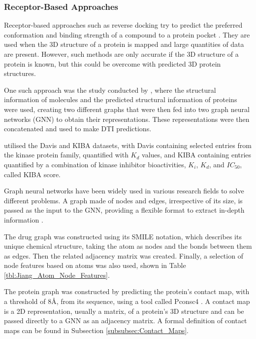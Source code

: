 \bigskip

\subsubsection{Receptor-Based Approaches}
\label{subsubsec:Receptor_Based_Approaches}

Receptor-based approaches such as reverse docking try to predict the preferred conformation and binding strength of a compound to a protein pocket \citep{Meng2011}. They are used when the 3D structure of a protein is mapped and large quantities of data are present. However, such methods are only accurate if the 3D structure of a protein is known, but this could be overcome with predicted 3D protein structures.

One such approach was the study conducted by \citet{Jiang2020}, where the structural information of molecules and the predicted structural information of proteins were used, creating two different graphs that were then fed into two graph neural networks (GNN) to obtain their representations. These representations were then concatenated and used to make DTI predictions.

\citet{Jiang2020} utilised the Davis \citep{Davis_Dataset} and KIBA \citep{KIBA_Dataset_1, KIBA_Dataset_2} datasets, with Davis containing selected entries from the kinase protein family, quantified with $K_d$ values, and KIBA containing entries quantified by a combination of kinase inhibitor bioactivities, $K_i$, $K_d$, and $IC_{50}$, called KIBA score.

Graph neural networks have been widely used in various research fields to solve different problems. A graph made of nodes and edges, irrespective of its size, is passed as the input to the GNN, providing a flexible format to extract in-depth information \citep{Jiang2020}. 

The drug graph was constructed using its SMILE notation, which describes its unique chemical structure, taking the atom as nodes and the bonds between them as edges. Then the related adjacency matrix was created. Finally, a selection of node features based on atoms was also used, shown in Table \ref{tbl:Jiang_Atom_Node_Features}.

The protein graph was constructed by predicting the protein's contact map, with a threshold of 8\AA, from its sequence, using a tool called Pconsc4 \citep{Pconsc4}. A contact map is a 2D representation, usually a matrix, of a protein's 3D structure and can be passed directly to a GNN as an adjacency matrix. A formal definition of contact maps can be found in Subsection \ref{subsubsec:Contact_Maps}.

